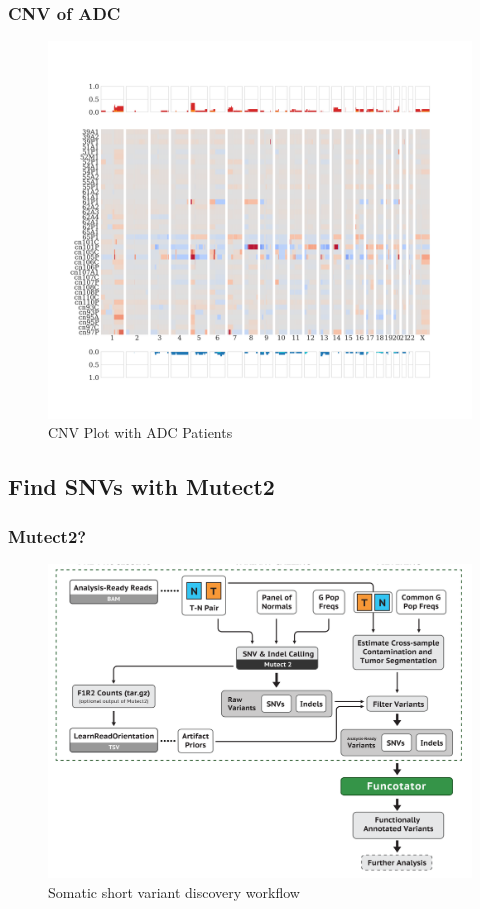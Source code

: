 \documentclass{beamer}
\begin{document}
    \begin{frame}
        \frametitle{CNV of ADC}

        \begin{figure}
            \includegraphics[height=0.7 \textheight]{figures/Sequenza/BWA-genome-ADC.pdf}
            \caption{CNV Plot with ADC Patients}
        \end{figure}
    \end{frame}

    \subsection{Find SNVs with Mutect2}
    \begin{frame}
        \frametitle{Mutect2?}

        \begin{figure}
            \includegraphics[width=0.6 \linewidth]{figures/Workflow/somatic_short_variants.png}
            \caption{Somatic short variant discovery workflow \protect\cite{gatk1, gatk2}}
        \end{figure}
    \end{frame}
\end{document}
